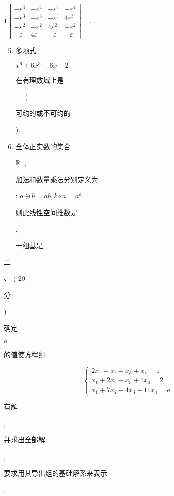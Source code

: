 \documentclass[10pt]{article}
\begin{document}
$1 .\left|\begin{array}{cccc}-\varepsilon^{4} & -\varepsilon^{4} & -\varepsilon^{4} & -\varepsilon^{4} \\ -\varepsilon^{3} & -\varepsilon^{3} & -\varepsilon^{3} & 4 \varepsilon^{3} \\ -\varepsilon^{2} & -\varepsilon^{2} & 4 \varepsilon^{2} & -\varepsilon^{2} \\ -\varepsilon & 4 \varepsilon & -\varepsilon & -\varepsilon\end{array}\right|=\underline{\text {. }}$.

\begin{enumerate}
  \setcounter{enumi}{4}
  \item \begin{CJK}{UTF8}{mj}多项式\end{CJK} $x^{6}+6 x^{3}-6 x-2$ \begin{CJK}{UTF8}{mj}在有理数域上是\end{CJK} $\quad$ (\begin{CJK}{UTF8}{mj}可约的或不可约的\end{CJK}).

  \item \begin{CJK}{UTF8}{mj}全体正实数的集合\end{CJK} $\mathbb{R}^{+}$, \begin{CJK}{UTF8}{mj}加法和数量乘法分别定义为\end{CJK}: $a \oplus b=a b, k \circ a=a^{k}$. \begin{CJK}{UTF8}{mj}则此线性空间维数是\end{CJK} ,\begin{CJK}{UTF8}{mj}一组基是\end{CJK}

\end{enumerate}
\begin{CJK}{UTF8}{mj}二\end{CJK}、 ( 20 \begin{CJK}{UTF8}{mj}分\end{CJK}) \begin{CJK}{UTF8}{mj}确定\end{CJK} $a$ \begin{CJK}{UTF8}{mj}的值使方程组\end{CJK}
$$
\left\{\begin{array}{l}
2 x_{1}-x_{2}+x_{3}+x_{4}=1 \\
x_{1}+2 x_{2}-x_{3}+4 x_{4}=2 \\
x_{1}+7 x_{2}-4 x_{3}+11 x_{4}=a
\end{array}\right.
$$
\begin{CJK}{UTF8}{mj}有解\end{CJK}, \begin{CJK}{UTF8}{mj}并求出全部解\end{CJK}, \begin{CJK}{UTF8}{mj}要求用其导出组的基础解系来表示\end{CJK}.
\end{document}

